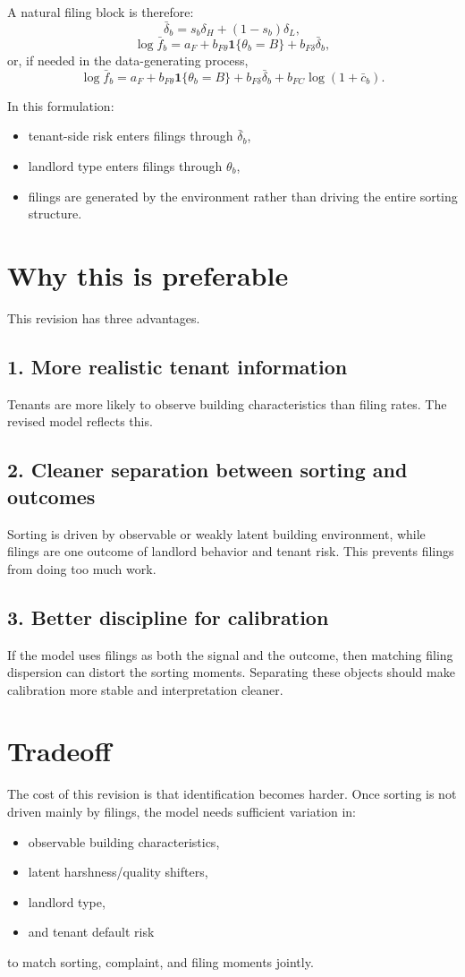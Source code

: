 \documentclass[11pt]{article}
\begin{document}
A natural filing block is therefore:
\[
\bar \delta_b = s_b\delta_H + (1-s_b)\delta_L,
\]
\[
\log \bar f_b = a_F + b_{F\theta}\mathbf 1\{\theta_b=B\} + b_{F\delta}\bar\delta_b,
\]
or, if needed in the data-generating process,
\[
\log \bar f_b = a_F + b_{F\theta}\mathbf 1\{\theta_b=B\} + b_{F\delta}\bar\delta_b + b_{FC}\log(1+\bar c_b).
\]

In this formulation:
\begin{itemize}
    \item tenant-side risk enters filings through $\bar\delta_b$,
    \item landlord type enters filings through $\theta_b$,
    \item filings are generated by the environment rather than driving the entire sorting structure.
\end{itemize}

\section{Why this is preferable}
This revision has three advantages.

\subsection*{1. More realistic tenant information}
Tenants are more likely to observe building characteristics than filing rates. The revised model reflects this.

\subsection*{2. Cleaner separation between sorting and outcomes}
Sorting is driven by observable or weakly latent building environment, while filings are one outcome of landlord behavior and tenant risk. This prevents filings from doing too much work.

\subsection*{3. Better discipline for calibration}
If the model uses filings as both the signal and the outcome, then matching filing dispersion can distort the sorting moments. Separating these objects should make calibration more stable and interpretation cleaner.

\section{Tradeoff}
The cost of this revision is that identification becomes harder. Once sorting is not driven mainly by filings, the model needs sufficient variation in:
\begin{itemize}
    \item observable building characteristics,
    \item latent harshness/quality shifters,
    \item landlord type,
    \item and tenant default risk
\end{itemize}
to match sorting, complaint, and filing moments jointly.
\end{document}
